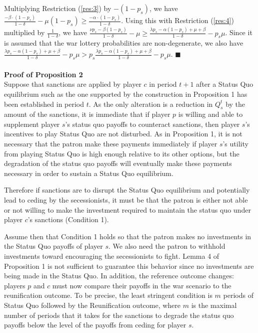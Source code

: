 \documentclass[11pt,letterpaper, notitlepage]{article}
\newcommand{\de}{\delta}
\begin{document}
Multiplying Restriction (\ref{res:3}) by $-(1-p_s)$, we have $\frac{-\beta \cdot (1-p_s)}{1-\de} -\mu (1-p_s) \geq \frac{-\alpha \cdot (1-p_s)}{1-\de}$. Using this with Restriction (\ref{res:4}) multiplied by $\frac{1}{1-\de}$, we have $\frac{\nu p_s - \beta (1-p_s)}{1-\de} -\mu \geq \frac{\lambda p_s - \alpha (1-p_s) + \mu + \beta}{1-\de} -p_s \mu$. Since it is assumed that the war lottery probabilities are non-degenerate, we also have $\frac{\lambda p_s - \alpha (1-p_s) + \mu + \beta}{1-\de} -p_s \mu > p_s \frac{\lambda p_s - \alpha (1-p_s) + \mu + \beta}{1-\de} -p_s \mu$. \hfill $\blacksquare$
\\
\\
{\bf Proof of Proposition 2} \\
Suppose that sanctions are applied by player $c$ in period $t+1$ after a Status Quo equilibrium such as the one supported by the construction in Proposition 1 has been established in period $t$. As the only alteration is a reduction in $Q_s^t$ by the amount of the sanctions, it is immediate that if player $p$ is willing and able to supplement player $s$'s status quo payoffs to counteract sanctions, then player $s$'s incentives to play Status Quo are not disturbed. As in Proposition 1, it is not necessary that the patron make these payments immediately if player $s$'s utility from playing Status Quo is high enough relative to its other options, but the degradation of the status quo payoffs will eventually make these payments necessary in order to sustain a Status Quo equilibrium.

Therefore if sanctions are to disrupt the Status Quo equilibrium and potentially lead to ceding by the secessionists, it must be that the patron is either not able or not willing to make the investment required to maintain the status quo under player $c$'s sanctions (Condition 1).

Assume then that Condition 1 holds so that the patron makes no investments in the Status Quo payoffs of player $s$. We also need the patron to withhold investments toward encouraging the secessionists to fight. Lemma 4 of Proposition 1 is not sufficient to guarantee this behavior since no investments are being made in the Status Quo. In addition, the reference outcome changes: players $p$ and $c$ must now compare their payoffs in the war scenario to the reunification outcome. To be precise, the least stringent condition is $m$ periods of Status Quo followed by the Reunification outcome, where $m$ is the maximal number of periods that it takes for the sanctions to degrade the status quo payoffs below the level of the payoffs from ceding for player $s$. 
\end{document}
